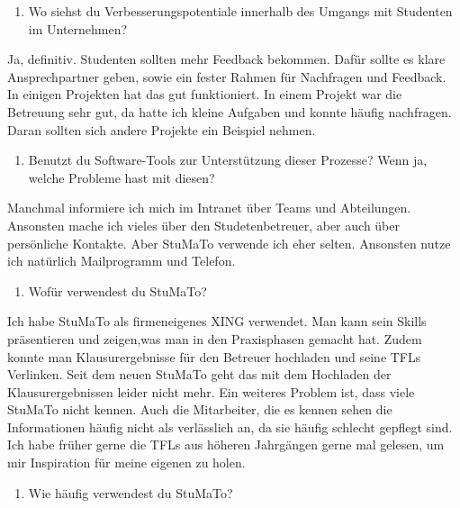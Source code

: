 \documentclass[
  12pt,
  ngerman,
  a4paper,
]{article}
\providecommand{\tightlist}{%
  \setlength{\itemsep}{0pt}\setlength{\parskip}{0pt}}
\begin{document}
\begin{enumerate}
\def\labelenumi{\arabic{enumi}.}
\setcounter{enumi}{7}
\tightlist
\item
  Wo siehst du Verbesserungspotentiale innerhalb des Umgangs mit
  Studenten im Unternehmen?
\end{enumerate}

Ja, definitiv. Studenten sollten mehr Feedback bekommen. Dafür sollte es
klare Ansprechpartner geben, sowie ein fester Rahmen für Nachfragen und
Feedback. In einigen Projekten hat das gut funktioniert. In einem
Projekt war die Betreuung sehr gut, da hatte ich kleine Aufgaben und
konnte häufig nachfragen. Daran sollten sich andere Projekte ein
Beispiel nehmen.

\begin{enumerate}
\def\labelenumi{\arabic{enumi}.}
\setcounter{enumi}{8}
\tightlist
\item
  Benutzt du Software-Tools zur Unterstützung dieser Prozesse? Wenn ja,
  welche Probleme hast mit diesen?
\end{enumerate}

Manchmal informiere ich mich im Intranet über Teams und Abteilungen.
Ansonsten mache ich vieles über den Studetenbetreuer, aber auch über
persönliche Kontakte. Aber StuMaTo verwende ich eher selten. Ansonsten
nutze ich natürlich Mailprogramm und Telefon.

\begin{enumerate}
\def\labelenumi{\arabic{enumi}.}
\setcounter{enumi}{9}
\tightlist
\item
  Wofür verwendest du StuMaTo?
\end{enumerate}

Ich habe StuMaTo als firmeneigenes XING verwendet. Man kann sein Skills
präsentieren und zeigen,was man in den Praxisphasen gemacht hat. Zudem
konnte man Klausurergebnisse für den Betreuer hochladen und seine TFLs
Verlinken. Seit dem neuen StuMaTo geht das mit dem Hochladen der
Klausurergebnissen leider nicht mehr. Ein weiteres Problem ist, dass
viele StuMaTo nicht kennen. Auch die Mitarbeiter, die es kennen sehen
die Informationen häufig nicht als verlässlich an, da sie häufig
schlecht gepflegt sind. Ich habe früher gerne die TFLs aus höheren
Jahrgängen gerne mal gelesen, um mir Inspiration für meine eigenen zu
holen.

\begin{enumerate}
\def\labelenumi{\arabic{enumi}.}
\setcounter{enumi}{10}
\tightlist
\item
  Wie häufig verwendest du StuMaTo?
\end{enumerate}
\end{document}
